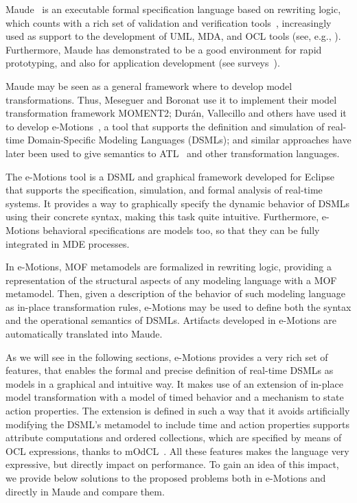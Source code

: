 
Maude~\cite{CDELMMQ:2002,CDELMMT:2007-book} is an executable formal specification language based on rewriting logic, which counts with a rich set of validation and verification tools~\cite{CDELMMT:2007-book,CDHLMO:2007}, increasingly used as support to the development of UML, MDA, and OCL tools (see, e.g., \cite{Boronat-Meseguer:08,RRDV:07-jot,Clavel-Egea:06}). Furthermore, Maude has demonstrated to be a good environment for rapid prototyping, and also for application development (see surveys~\cite{CDELMMT:2007-book,Meseguer:2012}). 

Maude may be seen as a general framework where to develop model transformations. Thus, Meseguer and Boronat use it to implement their model transformation framework MOMENT2; Dur\'an, Vallecillo and others have used it to develop e-Motions~\cite{RiveraDV10}, a tool that supports the definition and simulation of real-time Domain-Specific Modeling Languages (DSMLs); and similar approaches have later been used to give semantics to ATL~\cite{TroyaV10} and other transformation languages. 

The e-Motions tool is a DSML and graphical framework developed for Eclipse that supports the specification, simulation, and formal analysis of real-time systems. It provides a way to graphically specify the dynamic behavior of DSMLs using their concrete syntax, making this task quite intuitive. Furthermore, e-Motions behavioral specifications are models too, so that they can be fully integrated in MDE processes.

In e-Motions, MOF metamodels are formalized in rewriting logic, providing a representation of the structural aspects of any modeling language with a MOF metamodel. Then, given a description of the behavior of such modeling language as in-place transformation rules, e-Motions may be used to define both the syntax and the operational semantics of DSMLs. Artifacts developed in e-Motions are automatically translated into Maude.

As we will see in the following sections, e-Motions provides a very rich set of features, that enables the formal and precise definition of real-time DSMLs as models in a graphical and intuitive way. It makes use of an extension of in-place model transformation with a model of timed behavior and a mechanism to state action properties. The extension is defined in such a way that it avoids artificially modifying the DSML's metamodel to include time and action properties\delete{,} supports attribute computations and ordered collections, which are specified by means of OCL
expressions, thanks to mOdCL~\cite{Roldan-Duran:2008-tr}. All these features makes the language very expressive, but directly impact on performance. To gain an idea of this impact, we provide below solutions to the proposed problems both in e-Motions and directly in Maude and compare them. 


